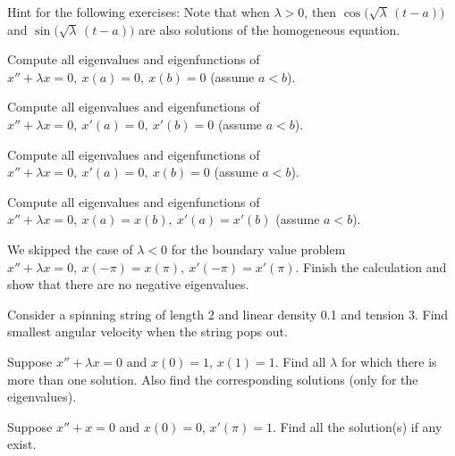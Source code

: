 \documentclass[12pt]{book}
\begin{document}
Hint for the following exercises:  Note that
when $\lambda > 0$, then
$\cos \bigl( \! \sqrt{\lambda}\, (t - a) \bigr)$
and $\sin  \bigl( \! \sqrt{\lambda}\, (t - a) \bigr)$
are also solutions of the homogeneous
equation.

\begin{exercise}
Compute all
eigenvalues and eigenfunctions of
$x'' + \lambda x = 0, ~ x(a) = 0, ~ x(b) = 0$ (assume $a < b$).
\end{exercise}

\begin{exercise}
Compute all
eigenvalues and eigenfunctions of
$x'' + \lambda x = 0, ~ x'(a) = 0, ~ x'(b) = 0$ (assume $a < b$).
\end{exercise}

\begin{exercise}
Compute all
eigenvalues and eigenfunctions of
$x'' + \lambda x = 0, ~ x'(a) = 0, ~ x(b) = 0$ (assume $a < b$).
\end{exercise}

\begin{exercise}
Compute all 
eigenvalues and eigenfunctions of
$x'' + \lambda x = 0, ~ x(a) = x(b), ~ x'(a) = x'(b)$ (assume $a < b$).
\end{exercise}

\begin{exercise}
We skipped the case of $\lambda < 0$ for
the boundary value problem
$x'' + \lambda x = 0, ~ x(-\pi) = x(\pi), ~ x'(-\pi) = x'(\pi)$.
Finish the calculation and show that there are no negative eigenvalues.
\end{exercise}

\setcounter{exercise}{100}

\begin{exercise}
Consider a spinning string of length 2 and linear density 0.1 and tension 3.
Find smallest angular velocity when the string pops out.
\end{exercise}

\begin{exercise}
Suppose $x'' + \lambda x = 0$ and $x(0)=1$, $x(1) = 1$.
Find all $\lambda$ for which there is more
than one solution.  Also find the corresponding solutions (only for the
eigenvalues).
\end{exercise}

\begin{exercise}
Suppose $x'' + x = 0$ and $x(0)=0$, $x'(\pi) = 1$.
Find all the solution(s) if any exist.
\end{exercise}
\end{document}
